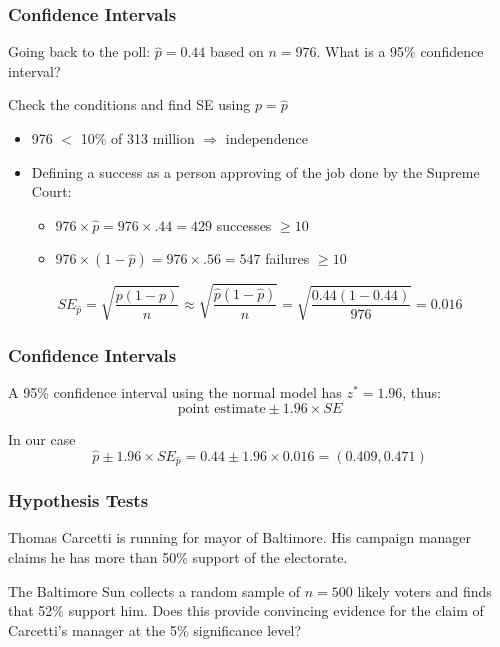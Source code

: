 \documentclass[handout]{beamer}
\newcommand{\blue}[1]{\textcolor{blue2}{#1}}
\newcommand{\phat}{\widehat{p}}
\begin{document}
\begin{frame}[fragile]
\frametitle{Confidence Intervals}

Going back to the poll: $\phat=0.44$ based on $n=976$.  What is a 95\% confidence interval?

\vspace{0.25cm}

\pause Check the conditions and find SE \blue{using $p=\phat$}

\begin{itemize}
\pause \item 976 $<$ 10\% of 313 million $\Rightarrow$ independence
\pause \item Defining a success as a person approving of the job done by the Supreme Court:
\pause
\begin{itemize}
\item $976 \times \phat = 976 \times .44 = 429$ successes $\geq 10$
\item $976 \times (1-\phat) = 976 \times .56 = 547$ failures $\geq 10$
\end{itemize}
\end{itemize}
\pause
\[
SE_{\phat} = \sqrt{\frac{p(1-p)}{n}} \approx \sqrt{\frac{\phat(1-\phat)}{n}} = \sqrt{\frac{0.44(1-0.44)}{976}} = 0.016
\]
\end{frame}


\begin{frame}[fragile]
\frametitle{Confidence Intervals}

A 95\% confidence interval using the normal model has $z^*=1.96$, thus:
\[
\mbox{point estimate} \pm 1.96 \times SE
\]

\pause In our case
\[
\phat \pm 1.96\times SE_{\phat} = 0.44 \pm 1.96 \times 0.016 = (0.409, 0.471)
\]

\end{frame}


\begin{frame}[fragile]
\frametitle{Hypothesis Tests}
Thomas Carcetti is running for mayor of Baltimore.  His campaign manager \blue{claims} he has more than 50\% support of the electorate.  

\vspace{0.5cm}

\pause The Baltimore Sun collects a random sample of $n=500$ likely voters and finds that 52\% support him.  Does this provide convincing evidence for the claim of Carcetti's manager at the 5\% significance level?

\end{frame}
\end{document}
